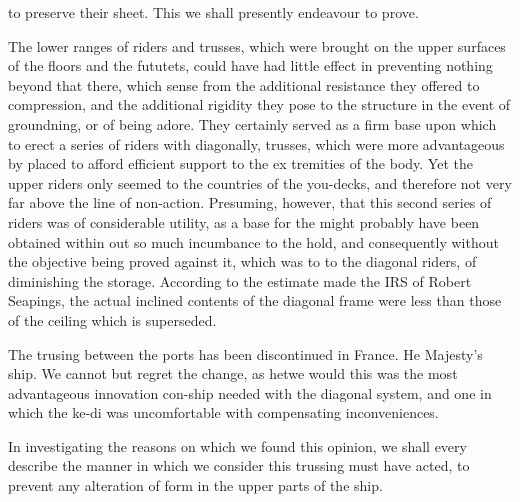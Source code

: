 \documentclass{article}
\begin{document}
to preserve their sheet. This we shall presently endeavour to prove.

The lower ranges of riders and trusses, which were brought on the upper surfaces of the floors and the fututets, could have had little effect in preventing nothing beyond that there, which sense from the additional resistance they offered to compression, and the additional rigidity they pose to the structure in the event of groundning, or of being adore. They certainly served as a firm base upon which to erect a series of riders with diagonally, trusses, which were more advantageous by placed to afford efficient support to the ex tremities of the body. Yet the upper riders only seemed to the countries of the you-decks, and therefore not very far above the line of non-action. Presuming, however, that this second series of riders was of considerable utility, as a base for the might probably have been obtained within out so much incumbance to the hold, and consequently without the objective being proved against it, which was to to the diagonal riders, of diminishing the storage. According to the estimate made the IRS of Robert Seapings, the actual inclined contents of the diagonal frame were less than those of the ceiling which is superseded.

The trusing between the ports has been discontinued in France. He Majesty's ship. We cannot but regret the change, as hetwe would this was the most advantageous innovation con-ship needed with the diagonal system, and one in which the ke-di was uncomfortable with compensating inconveniences.

In investigating the reasons on which we found this opinion, we shall every describe the manner in which we consider this trussing must have acted, to prevent any alteration of form in the upper parts of the ship.
\end{document}

